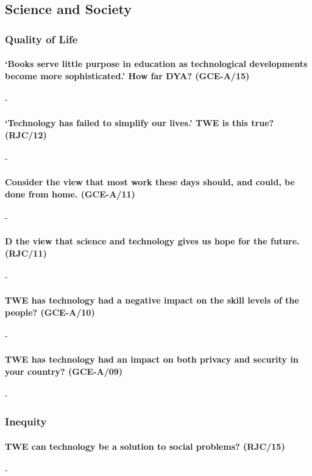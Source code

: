 \documentclass[../../main]{subfiles}
\begin{document}
\subsection{Science and Society}


\subsubsection{Quality of Life}

\paragraph{`Books serve little purpose in education as technological developments become more sophisticated.' How far DYA? (GCE-A/15)}-

\paragraph{`Technology has failed to simplify our lives.' TWE is this true? (RJC/12)}-

\paragraph{Consider the view that most work these days should, and could, be done from home. (GCE-A/11)}-

\paragraph{D the view that science and technology gives us hope for the future. (RJC/11)}-

\paragraph{TWE has technology had a negative impact on the skill levels of the people? (GCE-A/10)}-

\paragraph{TWE has technology had an impact on both privacy and security in your country? (GCE-A/09)}-


\subsubsection{Inequity}

\paragraph{TWE can technology be a solution to social problems? (RJC/15)}-
\end{document}
